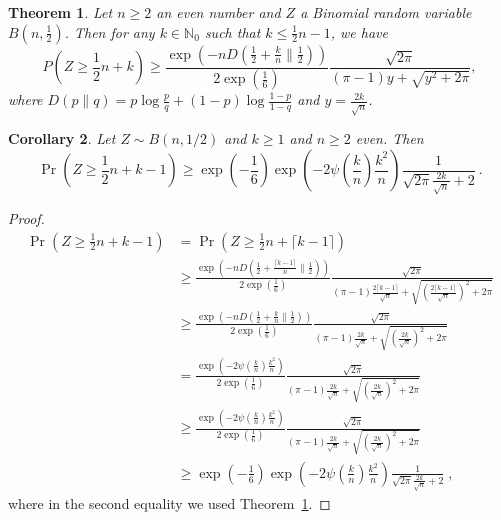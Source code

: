 \documentclass{article}
\newcommand{\field}[1]{\mathbb{#1}}
\newcommand{\Nat}{\field{N}}
\newtheorem{theorem}{Theorem}
\newtheorem{corrollary}[theorem]{Corollary}
\begin{document}
\begin{theorem}
\label{lemma:bin}
Let $n \ge 2$ an even number and $Z$ a Binomial random variable $B(n,\frac{1}{2})$. Then for any $k \in \Nat_0$ such that $k\le \frac{1}{2}n-1$, we have
\[
P\left( Z \ge \frac{1}{2} n + k\right)
\ge  \frac{\exp\left(-n D(\frac{1}{2}+\frac{k}{n}\|\frac{1}{2})\right)}{2 \exp\left(\frac{1}{6}\right)} \frac{\sqrt{2 \pi}}{(\pi-1)y+\sqrt{y^2+2 \pi}},
\]
where $D(p\|q)=p \log \frac{p}{q}+(1-p) \log\frac{1-p}{1-q}$ and $y=\frac{2 k}{\sqrt{n}}$.
\end{theorem}
%
\begin{corrollary}
Let $Z \sim B(n, 1/2)$ and $k \ge 1$ and $n \ge 2$ even. Then
\[
\Pr(Z \ge \frac{1}{2} n + k-1) \ge \exp\left(-\frac{1}{6}\right) \exp\left(- 2 \psi\left(\frac{k}{n}\right) \frac{k^2}{n} \right) \frac{1}{\sqrt{2\pi} \frac{2 k}{\sqrt{n}} + 2 }~.
\]
\end{corrollary}
\begin{proof}
\begin{align*}
\Pr(Z \ge  \frac{1}{2} n + k-1)
& = \Pr(Z \ge \frac{1}{2} n + \lceil k -1\rceil) \\
& \ge \frac{\exp\left(-n D(\frac{1}{2}+\frac{\lceil k -1\rceil}{n} \| \frac{1}{2})\right)}{2 \exp\left(\frac{1}{6}\right)} \frac{\sqrt{2 \pi}}{(\pi-1)\frac{2\lceil k -1\rceil}{\sqrt{n}}+\sqrt{\left(\frac{2\lceil k -1\rceil}{\sqrt{n}}\right)^2+2 \pi}} \\
& \ge \frac{\exp\left(-n D(\frac{1}{2}+\frac{k}{n} \| \frac{1}{2})\right)}{2 \exp\left(\frac{1}{6}\right)} \frac{\sqrt{2 \pi}}{(\pi-1)\frac{2k}{\sqrt{n}}+\sqrt{\left(\frac{2k}{\sqrt{n}}\right)^2+2 \pi}} \\
& = \frac{\exp\left(- 2 \psi(\frac{k}{n}) \frac{k^2}{n} \right)}{2 \exp\left(\frac{1}{6}\right)} \frac{\sqrt{2 \pi}}{(\pi-1)\frac{2k}{\sqrt{n}}+\sqrt{\left(\frac{2k}{\sqrt{n}}\right)^2+2 \pi}} \\
& \ge \frac{\exp\left(- 2 \psi(\frac{k}{n}) \frac{k^2}{n} \right)}{2 \exp\left(\frac{1}{6}\right)} \frac{\sqrt{2 \pi}}{(\pi-1)\frac{2k}{\sqrt{n}}+\sqrt{\left(\frac{2k}{\sqrt{n}}\right)^2+2 \pi}} \\
& \ge \exp\left(-\frac{1}{6}\right) \exp\left(- 2 \psi\left(\frac{k}{n}\right) \frac{k^2}{n} \right) \frac{1}{\sqrt{2\pi} \frac{2 k}{\sqrt{n}} + 2} \; ,
\end{align*}
where in the second equality we used Theorem~\ref{lemma:bin}.
\end{proof}
\end{document}
